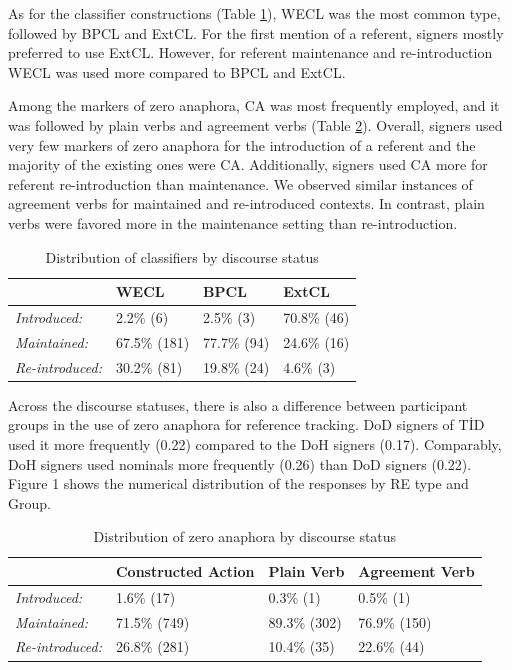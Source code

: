\documentclass[review]{elsarticle} %
\begin{document}
As for the classifier constructions (Table \ref{tab:my-table4}), WECL
was the most common type, followed by BPCL and ExtCL. For the first
mention of a referent, signers mostly preferred to use ExtCL. However,
for referent maintenance and re-introduction WECL was used more compared
to BPCL and ExtCL.

Among the markers of zero anaphora, CA was most frequently employed, and
it was followed by plain verbs and agreement verbs (Table
\ref{tab:my-table5}). Overall, signers used very few markers of zero
anaphora for the introduction of a referent and the majority of the
existing ones were CA. Additionally, signers used CA more for referent
re-introduction than maintenance. We observed similar instances of
agreement verbs for maintained and re-introduced contexts. In contrast,
plain verbs were favored more in the maintenance setting than
re-introduction.

\begin{table}
\small
\caption{Distribution of classifiers by discourse status}
\label{tab:my-table4}
\begin{tabular}{llll}
\hline
                        & WECL          & BPCL        & ExtCL         \\ \hline
\textit{Introduced:}    & 2.2\% (6)    & 2.5\% (3)   & 70.8\% (46) \\
\textit{Maintained:}    & 67.5\% (181) & 77.7\% (94) & 24.6\% (16) \\
\textit{Re-introduced:} & 30.2\% (81)   & 19.8\% (24)   & 4.6\% (3)   \\ \hline
\end{tabular}
\end{table}

Across the discourse statuses, there is also a difference between
participant groups in the use of zero anaphora for reference tracking.
DoD signers of TİD used it more frequently (0.22) compared to the DoH
signers (0.17). Comparably, DoH signers used nominals more frequently
(0.26) than DoD signers (0.22). Figure 1 shows the numerical
distribution of the responses by RE type and Group.

\begin{table}
\small
\caption{Distribution of zero anaphora by discourse status}
\label{tab:my-table5}
\begin{tabular}{llll}
\hline
                        & Constructed Action & Plain Verb    & Agreement Verb \\ \hline
\textit{Introduced:}    & 1.6\% (17)        & 0.3\% (1)    & 0.5\% (1)      \\
\textit{Maintained:}    & 71.5\% (749)      & 89.3\% (302) & 76.9\% (150)  \\
\textit{Re-introduced:} & 26.8\% (281)      & 10.4\% (35)   & 22.6\% (44)   \\ \hline
\end{tabular}
\end{table}
\end{document}
